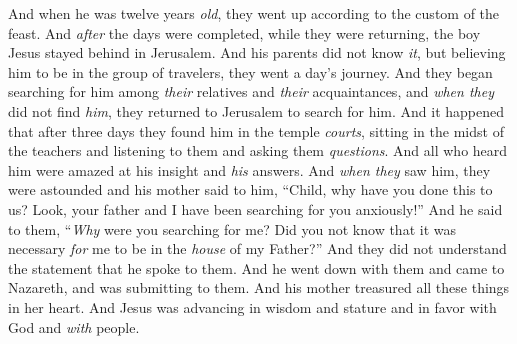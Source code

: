 \begin{biblechapter}
\verse And when he was twelve years \textit{old}, they went up according to the custom of the feast.
\verse And \textit{after} the days were completed, while they were returning, the boy Jesus stayed behind in Jerusalem. And his parents did not know \textit{it},
\verse but believing him to be in the group of travelers, they went a day’s journey. And they began searching for him among \textit{their} relatives and \textit{their} acquaintances,
\verse and \textit{when they} did not find \textit{him}, they returned to Jerusalem to search for him.
\verse And it happened that after three days they found him in the temple \textit{courts}, sitting in the midst of the teachers and listening to them and asking them \textit{questions}.
\verse And all who heard him were amazed at his insight and \textit{his} answers.
\verse And \textit{when they} saw him, they were astounded and his mother said to him, “Child, why have you done this to us? Look, your father and I have been searching for you anxiously!”
\verse And he said to them, “\textit{Why} were you searching for me? Did you not know that it was necessary \textit{for} me to be in the \textit{house} of my Father?”
\verse And they did not understand the statement that he spoke to them.
\verse And he went down with them and came to Nazareth, and was submitting to them. And his mother treasured all these things in her heart.
\verse And Jesus was advancing in wisdom and stature and in favor with God and \textit{with} people.
\end{biblechapter}

